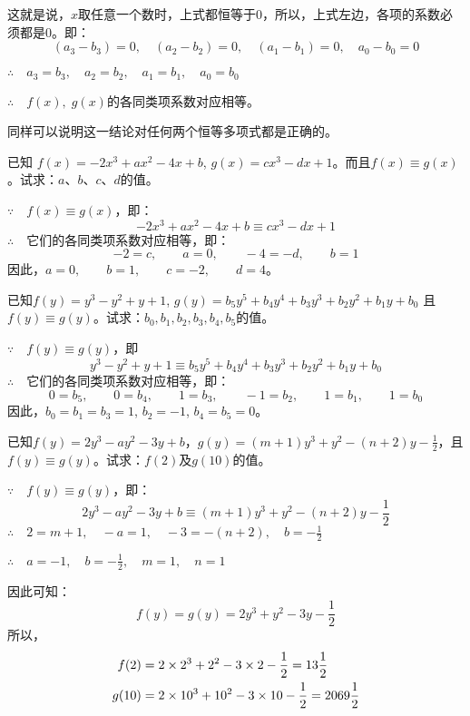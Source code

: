 这就是说，$x$取任意一个数时，上式都恒等于0，所以，上式左边，各项的系数必须都是0。即：
\[(a_3-b_3)=0,\quad (a_2-b_2)=0,\quad (a_1-b_1)=0,\quad a_0 -b_0= 0  \]

$\therefore\quad a_3=b_3,\quad a_2=b_2,\quad a_1=b_1,\quad a_0=b_0$

$\therefore\quad f(x),\; g(x)$的各同类项系数对应相等。

同样可以说明这一结论对任何两个恒等多项式都是正确的。

\begin{example}
    已知 $f(x)=-2x^3+ax^2-4x+b$, $g(x)=cx^3-dx+1$。而且$f(x)\equiv g(x)$。试求：$a$、$b$、$c$、$d$的值。
\end{example}

\begin{solution}
    $\because\quad f(x)\equiv g(x)$，即：
\[-2x^3+ax^2-4x+b\equiv cx^3-dx+1\]
$\therefore\quad $它们的各同类项系数对应相等，即： 
\[-2=c,\qquad a=0,\qquad -4=-d,\qquad b=1\]
因此，$a=0,\qquad b=1,\qquad c=-2,\qquad d=4$。
\end{solution}

\begin{example}
    已知$f(y)=y^3-y^2+y+1$, $g(y)=b_5y^5+b_4y^4+b_3y^3+b_2y^2+b_1y+b_0$ 且$f(y)\equiv g(y)$。试求：$b_0,b_1,b_2,b_3,b_4,b_5$的值。
\end{example}


\begin{solution}
$\because\quad f(y)\equiv g(y)$，即
\[y^3-y^2+y+1\equiv b_5y^5+b_4y^4+b_3y^3+b_2y^2+b_1y+b_0 \]
$\therefore\quad $它们的各同类项系数对应相等，即：
\[0=b_5,\qquad 0=b_4,\qquad 1=b_3,\qquad -1=b_2,\qquad 1=b_1,\qquad
1=b_0\]
 因此，$b_0=b_1=b_3=1$, $b_2=-1$, $b_4=b_5=0$。   
\end{solution}

\begin{example}
   已知$f(y)=2y^3-ay^2-3y+b$，$g(y)=(m+1)y^3+y^2-(n+2)y-\frac{1}{2}$，且$f(y)\equiv g(y)$。试求：$f(2)$及$g(10)$的值。 
\end{example}

\begin{solution}
$\because\quad f(y)\equiv g(y)$，即：
\[2y^3-ay^2-3y+b\equiv (m+1)y^3+y^2-(n+2)y-\frac{1}{2} \]
$\therefore\quad 2=m+1,\quad -a=1,\quad -3=-(n+2),\quad b=-\frac{1}{2}$

$\therefore\quad a=-1,\quad b=-\frac{1}{2},\quad m=1,\quad n=1$

因此可知：
\[f(y)=g(y)=2y^3+y^2-3y-\frac{1}{2} \]
所以，
\[\begin{split}
    f(2)&= 2\times 2^3+2^2-3\times 2-\dfrac{1}{2}=13\dfrac{1}{2}\\
    g(10)&=2\times 10^3+10^2-3\times 10-\dfrac{1}{2}=2069\dfrac{1}{2} 
\end{split}\]
\end{solution}


